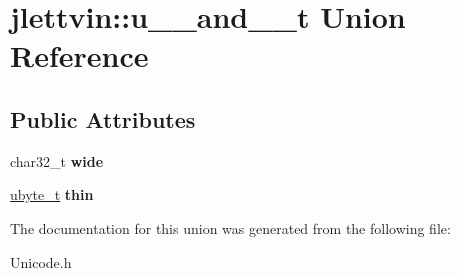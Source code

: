 \hypertarget{unionjlettvin_1_1u__32__and__8__t}{}\section{jlettvin\+:\+:u\+\_\+\_\+and\+\_\+\_\+t Union Reference}
\label{unionjlettvin_1_1u__32__and__8__t}
\subsection*{Public Attributes}
\begin{DoxyCompactItemize}
\item 
\hypertarget{unionjlettvin_1_1u__32__and__8__t_aea84e0b6f12e59b736e7aaacbade0573}{}char32\+\_\+t {\bfseries wide}\label{unionjlettvin_1_1u__32__and__8__t_aea84e0b6f12e59b736e7aaacbade0573}

\item 
\hypertarget{unionjlettvin_1_1u__32__and__8__t_a823a974741bb3fa8c90245ee2e38afd2}{}\hyperlink{namespacejlettvin_a7c7cf84f4fd67858c46a1077ed2e3ad4}{ubyte\+\_\+t} {\bfseries thin}\label{unionjlettvin_1_1u__32__and__8__t_a823a974741bb3fa8c90245ee2e38afd2}

\end{DoxyCompactItemize}


The documentation for this union was generated from the following file\+:\begin{DoxyCompactItemize}
\item 
Unicode.\+h\end{DoxyCompactItemize}

